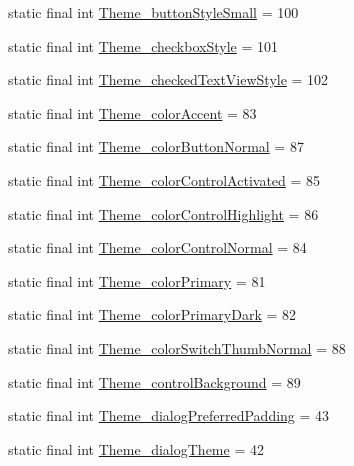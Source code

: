 \begin{DoxyCompactItemize}
\item 
static final int \hyperlink{classcheck_1_1test_1_1_r_1_1styleable_aaaa10bba1d9d98154b1920fc7823a5ed}{Theme\+\_\+button\+Style\+Small} = 100
\item 
static final int \hyperlink{classcheck_1_1test_1_1_r_1_1styleable_a591338acd9ab74487b26ca7193e08bc4}{Theme\+\_\+checkbox\+Style} = 101
\item 
static final int \hyperlink{classcheck_1_1test_1_1_r_1_1styleable_a3ea486b33baebd01084683194dba833d}{Theme\+\_\+checked\+Text\+View\+Style} = 102
\item 
static final int \hyperlink{classcheck_1_1test_1_1_r_1_1styleable_a0066926f266b5ba28e4da64a5ee29bb9}{Theme\+\_\+color\+Accent} = 83
\item 
static final int \hyperlink{classcheck_1_1test_1_1_r_1_1styleable_a3cf28f21d7d92dd03cab898e43cd3cf9}{Theme\+\_\+color\+Button\+Normal} = 87
\item 
static final int \hyperlink{classcheck_1_1test_1_1_r_1_1styleable_a1d6c74771db390d0820612ca1d065c4d}{Theme\+\_\+color\+Control\+Activated} = 85
\item 
static final int \hyperlink{classcheck_1_1test_1_1_r_1_1styleable_ac7b968aea5587a45f1935f379de1d8b7}{Theme\+\_\+color\+Control\+Highlight} = 86
\item 
static final int \hyperlink{classcheck_1_1test_1_1_r_1_1styleable_a3fd140e79d5c291ac4ded3f747b333fd}{Theme\+\_\+color\+Control\+Normal} = 84
\item 
static final int \hyperlink{classcheck_1_1test_1_1_r_1_1styleable_add0a3bacfd686c812b1d7045c47b17d5}{Theme\+\_\+color\+Primary} = 81
\item 
static final int \hyperlink{classcheck_1_1test_1_1_r_1_1styleable_a06639297583ba9162a788c3513b9266c}{Theme\+\_\+color\+Primary\+Dark} = 82
\item 
static final int \hyperlink{classcheck_1_1test_1_1_r_1_1styleable_a0380932431c2ed2292807679db341649}{Theme\+\_\+color\+Switch\+Thumb\+Normal} = 88
\item 
static final int \hyperlink{classcheck_1_1test_1_1_r_1_1styleable_a8b78be6b3ea5c1a175341e08d853b1bd}{Theme\+\_\+control\+Background} = 89
\item 
static final int \hyperlink{classcheck_1_1test_1_1_r_1_1styleable_a49869154ae939603270f1df062f8b8f5}{Theme\+\_\+dialog\+Preferred\+Padding} = 43
\item 
static final int \hyperlink{classcheck_1_1test_1_1_r_1_1styleable_a25fd3dc52a7a1eab045aeadf0e4aa6c6}{Theme\+\_\+dialog\+Theme} = 42

\end{DoxyCompactItemize}
